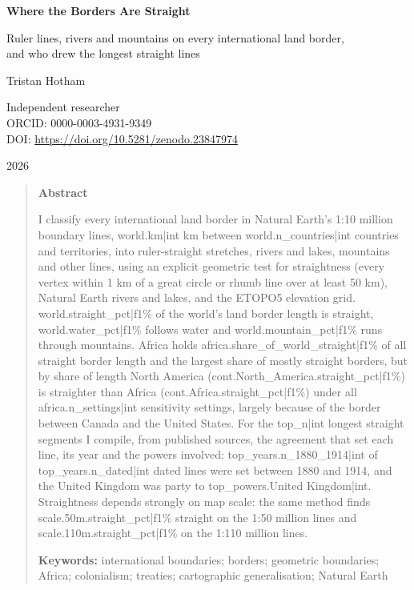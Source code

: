 \documentclass[11pt,a4paper]{article}
\begin{document}
\begin{center}
{\Large\bfseries Where the Borders Are Straight\par}
\vspace{0.4em}
{\large Ruler lines, rivers and mountains on every international land border,\\and who drew the longest straight lines\par}
\vspace{1.2em}
{\large Tristan Hotham\par}
\vspace{0.3em}
{\small Independent researcher\\
ORCID: 0000-0003-4931-9349\\
DOI: \href{https://doi.org/10.5281/zenodo.23847974}{https://doi.org/10.5281/zenodo.23847974}\par}
\vspace{0.8em}
2026
\end{center}

\begin{quote}
\small
\begin{center}\textbf{Abstract}\end{center}
I classify every international land border in Natural Earth's 1:10 million boundary lines, {{world.km|int}} km between {{world.n_countries|int}} countries and territories, into ruler-straight stretches, rivers and lakes, mountains and other lines, using an explicit geometric test for straightness (every vertex within 1 km of a great circle or rhumb line over at least 50 km), Natural Earth rivers and lakes, and the ETOPO5 elevation grid. {{world.straight_pct|f1}}\% of the world's land border length is straight, {{world.water_pct|f1}}\% follows water and {{world.mountain_pct|f1}}\% runs through mountains. Africa holds {{africa.share_of_world_straight|f1}}\% of all straight border length and the largest share of mostly straight borders, but by share of length North America ({{cont.North_America.straight_pct|f1}}\%) is straighter than Africa ({{cont.Africa.straight_pct|f1}}\%) under all {{africa.n_settings|int}} sensitivity settings, largely because of the border between Canada and the United States. For the {{top_n|int}} longest straight segments I compile, from published sources, the agreement that set each line, its year and the powers involved: {{top_years.n_1880_1914|int}} of {{top_years.n_dated|int}} dated lines were set between 1880 and 1914, and the United Kingdom was party to {{top_powers.United Kingdom|int}}. Straightness depends strongly on map scale: the same method finds {{scale.50m.straight_pct|f1}}\% straight on the 1:50 million lines and {{scale.110m.straight_pct|f1}}\% on the 1:110 million lines.

\textbf{Keywords:} international boundaries; borders; geometric boundaries; Africa; colonialism; treaties; cartographic generalisation; Natural Earth
\end{quote}
\end{document}
